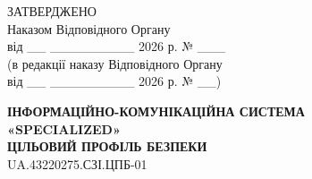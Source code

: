 \documentclass[10pt]{article}
\begin{document}
\begin{flushright}
ЗАТВЕРДЖЕНО\\
Наказом Відповідного Органу\\
від \_\_ \_\_\_\_\_\_\_\_\_ 2026 р. № \_\_\_\\
(в редакції наказу Відповідного Органу\\
від \_\_ \_\_\_\_\_\_\_\_\_ 2026 р. № \_\_)
\end{flushright}

\vspace{2cm}

\begin{center}
\textbf{\Large ІНФОРМАЦІЙНО-КОМУНІКАЦІЙНА СИСТЕМА}\\
\textbf{\Large «SPECIALIZED»}\\
\vspace{1cm}
\textbf{\Large ЦІЛЬОВИЙ ПРОФІЛЬ БЕЗПЕКИ}\\
\vspace{0.5cm}
\large UA.43220275.СЗІ.ЦПБ-01
\end{center}

\newpage
\end{document}
